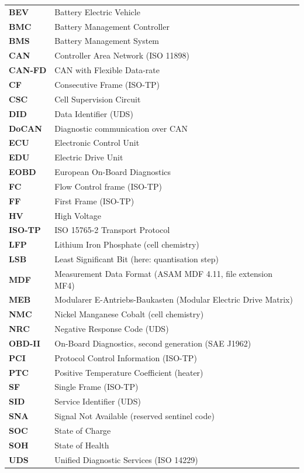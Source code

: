 \documentclass[11pt,a4paper,oneside,parskip=half]{scrreprt}
\begin{document}
\begin{tabular}{@{}lp{10.5cm}@{}}
\textbf{BEV}   & Battery Electric Vehicle \\
\textbf{BMC}   & Battery Management Controller \\
\textbf{BMS}   & Battery Management System \\
\textbf{CAN}   & Controller Area Network (ISO 11898) \\
\textbf{CAN-FD}& CAN with Flexible Data-rate \\
\textbf{CF}    & Consecutive Frame (ISO-TP) \\
\textbf{CSC}   & Cell Supervision Circuit \\
\textbf{DID}   & Data Identifier (UDS) \\
\textbf{DoCAN} & Diagnostic communication over CAN \\
\textbf{ECU}   & Electronic Control Unit \\
\textbf{EDU}   & Electric Drive Unit \\
\textbf{EOBD}  & European On-Board Diagnostics \\
\textbf{FC}    & Flow Control frame (ISO-TP) \\
\textbf{FF}    & First Frame (ISO-TP) \\
\textbf{HV}    & High Voltage \\
\textbf{ISO-TP}& ISO 15765-2 Transport Protocol \\
\textbf{LFP}   & Lithium Iron Phosphate (cell chemistry) \\
\textbf{LSB}   & Least Significant Bit (here: quantisation step) \\
\textbf{MDF}   & Measurement Data Format (ASAM MDF 4.11, file extension MF4) \\
\textbf{MEB}   & Modularer E-Antriebs-Baukasten (Modular Electric Drive Matrix) \\
\textbf{NMC}   & Nickel Manganese Cobalt (cell chemistry) \\
\textbf{NRC}   & Negative Response Code (UDS) \\
\textbf{OBD-II}& On-Board Diagnostics, second generation (SAE J1962) \\
\textbf{PCI}   & Protocol Control Information (ISO-TP) \\
\textbf{PTC}   & Positive Temperature Coefficient (heater) \\
\textbf{SF}    & Single Frame (ISO-TP) \\
\textbf{SID}   & Service Identifier (UDS) \\
\textbf{SNA}   & Signal Not Available (reserved sentinel code) \\
\textbf{SOC}   & State of Charge \\
\textbf{SOH}   & State of Health \\
\textbf{UDS}   & Unified Diagnostic Services (ISO 14229) \\
\end{tabular}
\end{document}
